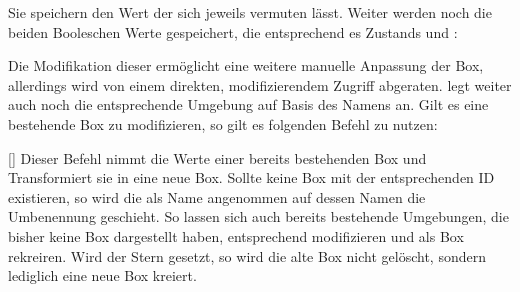 \vspace{-\baselineskip}
\vspace{-\baselineskip}
\vspace{-\baselineskip}
\vspace{-\baselineskip}
\vspace{-\baselineskip}
\vspace{-\baselineskip}
\vspace{-\baselineskip}
\vspace{-\baselineskip}
\vspace{-\baselineskip}
\vspace{-\baselineskip}
\vspace{-\baselineskip}
\vspace{-\baselineskip}
\vspace{-\baselineskip}
\vspace{-\baselineskip}

Sie speichern den Wert der sich jeweils vermuten lässt. Weiter werden noch die beiden Booleschen Werte gespeichert, die entsprechend es Zustands \T{\true} und \T{\false}:\newline
{}\vspace{-\baselineskip}

Die Modifikation dieser ermöglicht eine weitere manuelle Anpassung der Box, allerdings wird von einem direkten, modifizierendem Zugriff abgeraten.  legt weiter auch noch die entsprechende Umgebung auf Basis des Namens an. Gilt es eine bestehende Box zu modifizieren, so gilt es folgenden Befehl zu nutzen:


[\optStar{}\secline{}]
Dieser Befehl nimmt die Werte einer bereits bestehenden Box und Transformiert sie in eine neue Box. Sollte keine Box mit der entsprechenden ID existieren, so wird die  als Name angenommen auf dessen Namen die Umbenennung geschieht. So lassen sich auch bereits bestehende Umgebungen, die bisher keine Box dargestellt haben, entsprechend modifizieren und als Box rekreiren. Wird der Stern gesetzt, so wird die alte Box nicht gelöscht, sondern lediglich eine neue Box kreiert.


